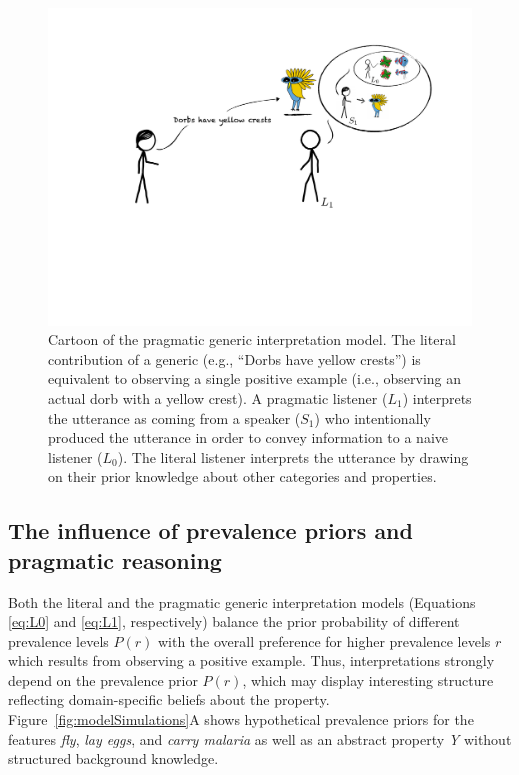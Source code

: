 \documentclass[floatsintext,doc]{apa6}
\begin{document}
\begin{figure}
\centering
\includegraphics{figs/cartoon.pdf}
\caption{\label{fig:cartoon}Cartoon of the pragmatic generic interpretation model. The literal contribution of a generic (e.g., \enquote{Dorbs have yellow crests}) is equivalent to observing a single positive example (i.e., observing an actual dorb with a yellow crest). A pragmatic listener (\(L_1\)) interprets the utterance as coming from a speaker (\(S_1\)) who intentionally produced the utterance in order to convey information to a naive listener (\(L_0\)). The literal listener interprets the utterance by drawing on their prior knowledge about other categories and properties.}
\end{figure}

\hypertarget{the-influence-of-prevalence-priors-and-pragmatic-reasoning}{%
\subsection{The influence of prevalence priors and pragmatic reasoning}\label{the-influence-of-prevalence-priors-and-pragmatic-reasoning}}

Both the literal and the pragmatic generic interpretation models (Equations \ref{eq:L0} and \ref{eq:L1}, respectively) balance the prior probability of different prevalence levels \(P(r)\) with the overall preference for higher prevalence levels \(r\) which results from observing a positive example.
Thus, interpretations strongly depend on the prevalence prior \(P(r)\), which may display interesting structure reflecting domain-specific beliefs about the property.
Figure~\ref{fig:modelSimulations}A shows hypothetical prevalence priors for the features \emph{fly}, \emph{lay eggs}, and \emph{carry malaria} as well as an abstract property \emph{Y} without structured background knowledge.
\end{document}
